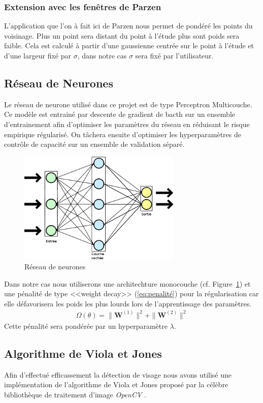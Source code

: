 \documentclass[a4paper,10pt,twocolumn]{extarticle}
\begin{document}
\subsubsection{Extension avec les fenêtres de Parzen}
L'application que l'on à fait ici de Parzen nous permet de pondéré les points du voisinage. Plus un point sera distant du point à l'étude plus sont poids sera faible. Cela est calculé à partir d'une gaussienne centrée sur le point à l'étude et d'une largeur fixé par $\sigma$, dans notre cas $\sigma$ sera fixé par l'utilisateur.

\subsection{Réseau de Neurones}
Le réseau de neurone utilisé dans ce projet est de type Perceptron Multicouche. Ce modèle est entrainé par descente de gradient de bacth sur un ensemble d'entrainement afin d'optimiser les paramètres du réseau en réduisant le risque empirique régularisé. On tâchera ensuite d'optimiser les hyperparamètres de contrôle de capacité sur un ensemble de validation séparé.
\begin{figure}[H]
  \begin{center}
    \includegraphics[width=220pt]{images_rapport/Neural_network.png}
    \caption{Réseau de neurones}
    \label{fig:nnet}
  \end{center}
\end{figure}
Dans notre cas nous utiliserons une architechture monocouche (cf. Figure~\ref{fig:nnet}) et une pénalité de type <<weight decay>> (\ref{eq:penalité}) pour la régularisation car elle défavorisera les poids les plus lourds lors de l'apprentissage des paramètres. 
\begin{align}\label{eq:penalité}
  \Omega(\theta) = \| \mathbf{W}^{(1)} \|^2 + \| \mathbf{W}^{(2)} \|^2
\end{align}
Cette pénalité sera pondérée par un hyperparamètre $\lambda$.

\subsection{Algorithme de Viola et Jones}
Afin d'effectué efficassement la détection de visage nous avons utilisé une implémentation de l'algorithme de Viola et Jones \cite{viola01} proposé par la célèbre bibliothèque de traitement d'image \textit{OpenCV} \cite{opencv}.
\end{document}
